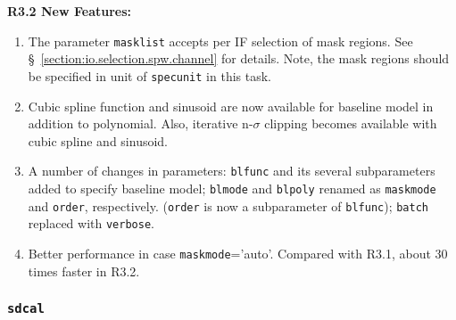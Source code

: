 \medskip
{\bf R3.2 New Features:}
\begin{enumerate}
\item The parameter {\tt masklist} accepts per IF selection of mask regions. 
      See \S~\ref{section:io.selection.spw.channel} for details. 
      Note, the mask regions should be specified in unit of {\tt specunit} 
      in this task.
\item Cubic spline function and sinusoid are now available for baseline 
      model in addition to polynomial. Also, iterative n-$\sigma$ clipping 
      becomes available with cubic spline and sinusoid. 
\item A number of changes in parameters: {\tt blfunc} and its several 
      subparameters added to specify baseline model; {\tt blmode} and 
      {\tt blpoly} renamed as {\tt maskmode} and {\tt order}, respectively. 
      ({\tt order} is now a subparameter of {\tt blfunc}); {\tt batch} 
      replaced with {\tt verbose}. 
\item Better performance in case {\tt maskmode}='auto'. Compared with R3.1, 
      about 30 times faster in R3.2. 
\end{enumerate}
  
\subsubsection{{\tt sdcal}}
\label{section:sd.sdtasks.tasks.sdcal}

